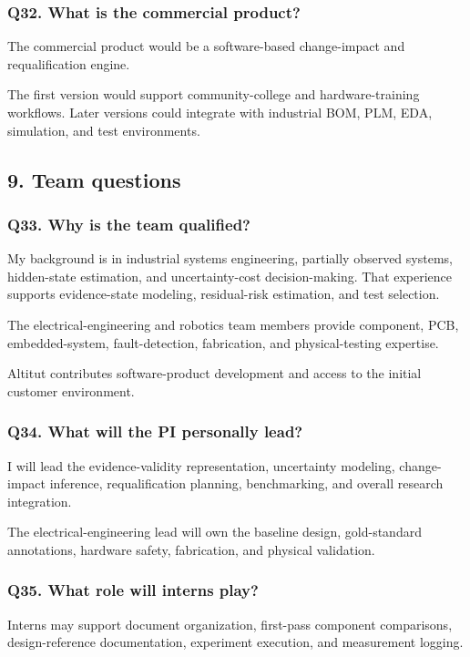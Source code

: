 \documentclass[12pt,letterpaper]{article}
\begin{document}
\subsubsection{Q32. What is the commercial product?}

The commercial product would be a software-based change-impact and requalification engine.

The first version would support community-college and hardware-training workflows. Later versions could integrate with industrial BOM, PLM, EDA, simulation, and test environments.

\subsection{9. Team questions}
\subsubsection{Q33. Why is the team qualified?}

My background is in industrial systems engineering, partially observed systems, hidden-state estimation, and uncertainty-cost decision-making. That experience supports evidence-state modeling, residual-risk estimation, and test selection.

The electrical-engineering and robotics team members provide component, PCB, embedded-system, fault-detection, fabrication, and physical-testing expertise.

Altitut contributes software-product development and access to the initial customer environment.

\subsubsection{Q34. What will the PI personally lead?}

I will lead the evidence-validity representation, uncertainty modeling, change-impact inference, requalification planning, benchmarking, and overall research integration.

The electrical-engineering lead will own the baseline design, gold-standard annotations, hardware safety, fabrication, and physical validation.

\subsubsection{Q35. What role will interns play?}

Interns may support document organization, first-pass component comparisons, design-reference documentation, experiment execution, and measurement logging.
\end{document}
